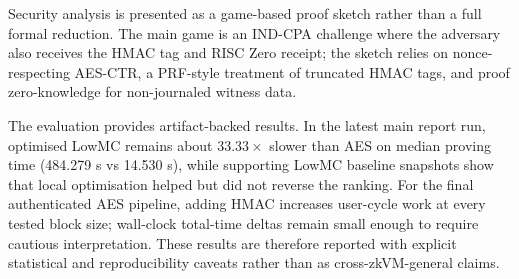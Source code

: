 Security analysis is presented as a game-based proof sketch rather than a full
formal reduction. The main game is an IND-CPA challenge where the adversary also
receives the HMAC tag and RISC Zero receipt; the sketch relies on nonce-respecting
AES-CTR, a PRF-style treatment of truncated HMAC tags, and proof zero-knowledge
for non-journaled witness data.

The evaluation provides artifact-backed results. In the latest main report run,
optimised LowMC remains about \(33.33\times\) slower than AES on median proving
time (484.279 s vs 14.530 s), while supporting LowMC baseline snapshots show that
local optimisation helped but did not reverse the ranking. For the final
authenticated AES pipeline, adding HMAC increases user-cycle work at every tested
block size; wall-clock total-time deltas remain small enough to require cautious
interpretation. These results are therefore reported with explicit statistical
and reproducibility caveats rather than as cross-zkVM-general claims.
